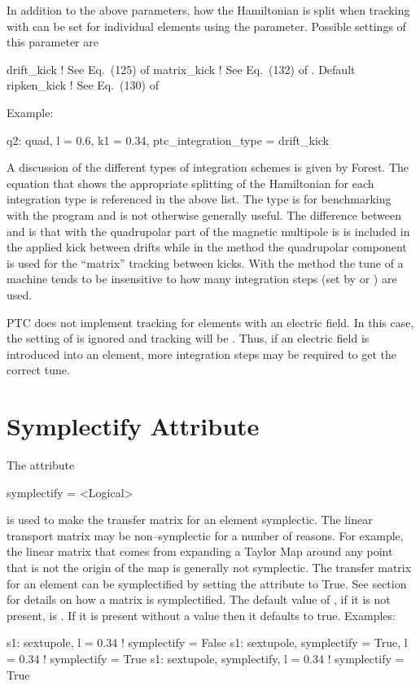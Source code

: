 In addition to the above parameters, how the Hamiltonian is split when
tracking with  can be set for individual elements using the
 parameter. Possible settings of this
parameter are
\begin{example}
  drift_kick    ! See Eq.~(125) of \cite{b:geo.int}
  matrix_kick   ! See Eq.~(132) of \cite{b:geo.int}. Default
  ripken_kick   ! See Eq.~(130) of \cite{b:geo.int}
\end{example}
Example:
\begin{example}
  q2: quad, l = 0.6, k1 = 0.34, ptc_integration_type = drift_kick
\end{example}
A discussion of the different types of integration schemes is given by
Forest\cite{b:geo.int}. The equation that shows the appropriate splitting of the
Hamiltonian for each integration type is referenced in the above list. The
 type is for benchmarking with the  program and is not
otherwise generally useful. The difference between  and  is
that with  the quadrupolar part of the magnetic multipole is is included in
the applied kick between drifts while in the  method the quadrupolar
component is used for the ``matrix'' tracking between kicks. With the
 method the tune of a machine tends to be insensitive to how many
integration steps (set by  or ) are used. 

PTC does not implement  tracking for elements with an electric field.  In
this case, the setting of  is ignored and tracking will be
. Thus, if an electric field is introduced into an element, more
integration steps may be required to get the correct tune.


\section{Symplectify Attribute}
\label{s:symp}

The  attribute
\begin{example}
  symplectify = <Logical>
\end{example}
is used to make the transfer matrix for an element symplectic. The
linear transport matrix may be non--symplectic for a number of
reasons.  For example, the linear matrix that comes from expanding a
Taylor Map around any point that is not the origin of the map is
generally not symplectic. The transfer matrix for an element can be
symplectified by setting the  attribute to True. See
section~ for details on how a matrix is
symplectified. The default value of , if it is not
present, is . If it is present without a value then it
defaults to true. Examples:
\begin{example}
  s1: sextupole, l = 0.34                       ! symplectify = False
  s1: sextupole, symplectify = True, l = 0.34   ! symplectify = True
  s1: sextupole, symplectify, l = 0.34          ! symplectify = True
\end{example}

